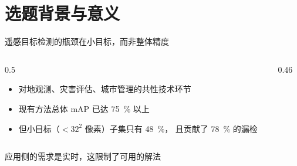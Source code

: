 \section{选题背景与意义}

\begin{frame}{遥感目标检测的瓶颈在小目标，而非整体精度}
  \begin{columns}[T, onlytextwidth]
    \begin{column}{0.5\textwidth}
      \begin{itemize}
        \setlength{\itemsep}{0.8em}
        \item 对地观测、灾害评估、城市管理的共性技术环节
        \item 现有方法总体 mAP 已达 \qty{75}{\percent} 以上
        \item 但小目标（$<32^2$ 像素）子集只有 \qty{48}{\percent}，
              且贡献了 \qty{78}{\percent} 的漏检
      \end{itemize}
    \end{column}
    \begin{column}{0.46\textwidth}
      \centering
    \end{column}
  \end{columns}

\end{frame}

\begin{frame}{应用侧的需求是实时，这限制了可用的解法}
  \begin{evidence}
  \end{evidence}
\end{frame}
